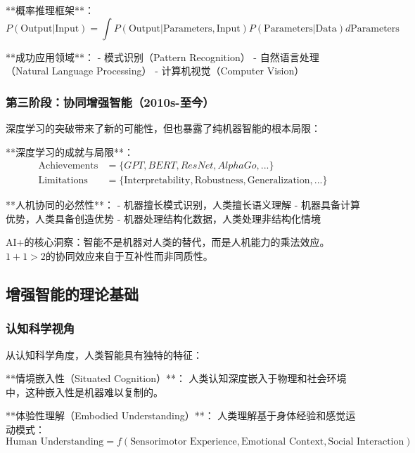 **概率推理框架**：
\begin{equation}
P(\text{Output}|\text{Input}) = \int P(\text{Output}|\text{Parameters}, \text{Input}) P(\text{Parameters}|\text{Data}) d\text{Parameters}
\end{equation}

**成功应用领域**：
- 模式识别（Pattern Recognition）
- 自然语言处理（Natural Language Processing）
- 计算机视觉（Computer Vision）

\subsubsection{第三阶段：协同增强智能（2010s-至今）}

深度学习的突破带来了新的可能性，但也暴露了纯机器智能的根本局限：

**深度学习的成就与局限**：
\begin{align}
\text{Achievements} &= \{GPT, BERT, ResNet, AlphaGo, ...\} \\
\text{Limitations} &= \{\text{Interpretability}, \text{Robustness}, \text{Generalization}, ...\}
\end{align}

**人机协同的必然性**：
- 机器擅长模式识别，人类擅长语义理解
- 机器具备计算优势，人类具备创造优势
- 机器处理结构化数据，人类处理非结构化情境

\begin{center}
AI+的核心洞察：智能不是机器对人类的替代，而是人机能力的乘法效应。$1 + 1 > 2$的协同效应来自于互补性而非同质性。
\end{center}

\subsection{增强智能的理论基础} %

\subsubsection{认知科学视角}

从认知科学角度，人类智能具有独特的特征：

**情境嵌入性（Situated Cognition）**：
人类认知深度嵌入于物理和社会环境中，这种嵌入性是机器难以复制的。

**体验性理解（Embodied Understanding）**：
人类理解基于身体经验和感觉运动模式：
\begin{equation}
\text{Human Understanding} = f(\text{Sensorimotor Experience}, \text{Emotional Context}, \text{Social Interaction})
\end{equation}

